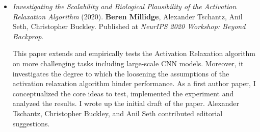 \begin{itemize}
\item \emph{Investigating the Scalability and Biological Plausibility of the Activation Relaxation Algorithm} (2020). \textbf{Beren Millidge}, Alexander Tschantz, Anil Seth, Christopher Buckley. Published at \emph{NeurIPS 2020 Workshop: Beyond Backprop}.

This paper extends and empirically tests the Activation Relaxation algorithm on more challenging tasks including large-scale CNN models. Moreover, it investigates the degree to which the loosening the assumptions of the activation relaxation algorithm hinder performance. As a first author paper, I conceptualized the core ideas to test, implemented the experiment and analyzed the results. I wrote up the initial draft of the paper. Alexander Tschantz, Christopher Buckley, and Anil Seth contributed editorial suggestions.
\end{itemize}
